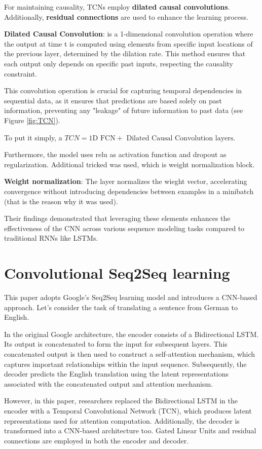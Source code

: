 For maintaining causality, TCNs employ \textbf{dilated causal convolutions}. Additionally, \textbf{residual connections} are used to enhance the learning process.

\textbf{Dilated Causal Convolution}: is a 1-dimensional convolution operation where the output at time t is computed using elements from specific input locations of the previous layer, determined by the dilation rate. This method ensures that each output only depends on specific past inputs, respecting the causality constraint.

This convolution operation is crucial for capturing temporal dependencies in sequential data, as it ensures that predictions are based solely on past information, preventing any "leakage" of future information to past data (see Figure \ref{fig:TCN}).


To put it simply, a $TCN= \text{1D FCN} + \text{ Dilated Causal Convolution layers} $.

Furthermore, the model uses relu as activation function and dropout as regularization. Additional tricked was used, which is weight normalization block.

\textbf{Weight normalization}: The layer normalizes the wieght vector, accelerating convergence without introducing dependencies between examples in a minibatch (that is the reason why it was used).


Their findings demonstrated that leveraging these elements enhances the effectiveness of the CNN across various sequence modeling tasks compared to traditional RNNs like LSTMs.



\section{Convolutional Seq2Seq learning}
This paper adopts Google's Seq2Seq learning model and introduces a CNN-based approach. Let's consider the task of translating a sentence from German to English.

In the original Google architecture, the encoder consists of a Bidirectional LSTM. Its output is concatenated to form the input for subsequent layers. This concatenated output is then used to construct a self-attention mechanism, which captures important relationships within the input sequence. Subsequently, the decoder predicts the English translation using the latent representations associated with the concatenated output and attention mechanism.

However, in this paper, researchers replaced the Bidirectional LSTM in the encoder with a Temporal Convolutional Network (TCN), which produces latent representations used for attention computation. Additionally, the decoder is transformed into a CNN-based architecture too. Gated Linear Units and residual connections are employed in both the encoder and decoder.

